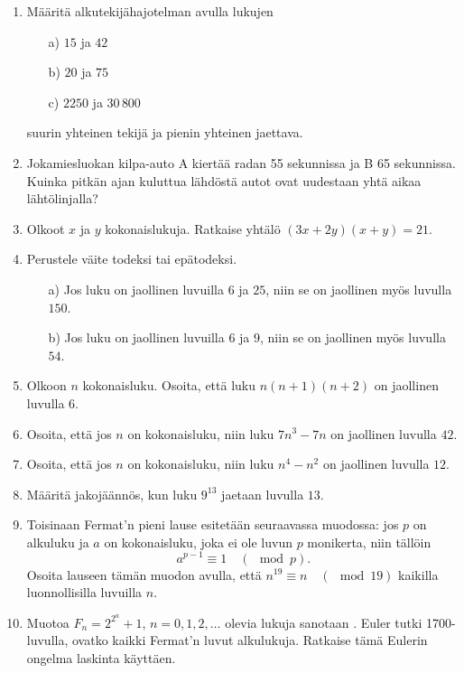 \begin{enumerate}
\item Määritä alkutekijähajotelman avulla lukujen
\begin{itemize}
\item[a)] $15$ ja $42$
\item[b)] $20$ ja $75$
\item[c)] $2250$ ja $30\,800$
\end{itemize}
suurin yhteinen tekijä ja pienin yhteinen jaettava.

\item
Jokamiesluokan kilpa-auto A kiertää radan 55 sekunnissa ja B
65 sekunnissa. Kuinka pitkän ajan kuluttua lähdöstä autot ovat
uudestaan yhtä aikaa lähtölinjalla?

\item Olkoot $x$ ja $y$ kokonaislukuja. Ratkaise yhtälö $(3x+2y)
(x+y)=21$.

\item Perustele väite todeksi tai epätodeksi.
\begin{itemize}
\item[a)] Jos luku on jaollinen luvuilla $6$ ja $25$, niin se on
jaollinen myös luvulla $150$.
\item[b)] Jos luku on jaollinen luvuilla $6$ ja $9$, niin se on
jaollinen myös luvulla $54$.
\end{itemize}

\item Olkoon $n$ kokonaisluku. Osoita, että luku $n(n+1)(n+2)$ on
jaollinen luvulla $6$.

\item Osoita, että jos $n$ on kokonaisluku, niin luku $7n^3 - 7n$
on jaollinen luvulla $42$.

\item Osoita, että jos $n$ on kokonaisluku, niin luku $n^4 - n^2$
on jaollinen luvulla $12$.

\item
Määritä jakojäännös, kun luku $9^{13}$ jaetaan luvulla $13$.

\item Toisinaan Fermat'n pieni lause esitetään seuraavassa
muodossa:
jos $p$ on alkuluku ja $a$ on kokonaisluku, joka ei ole
luvun $p$ monikerta, niin tällöin
\[
a^{p-1}\equiv 1\quad (\mod p).
\]
Osoita lauseen tämän muodon avulla, että $n^{19}\equiv n \quad
(\mod 19)$ kaikilla luonnollisilla luvuilla $n$.

\item
Muotoa $F_n = 2^{2^n}+1$, $n=0,1,2,\ldots$ olevia lukuja sanotaan
. Euler tutki 1700-luvulla, ovatko kaikki
Fermat'n luvut alkulukuja. Ratkaise tämä Eulerin ongelma laskinta
käyttäen.


\end{enumerate}

